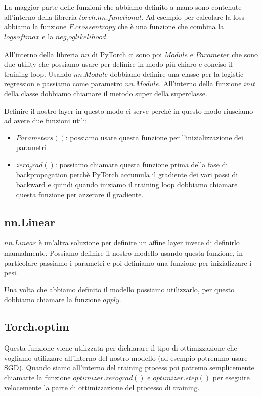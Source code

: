 \documentclass[14pt]{extreport}
\begin{document}
La maggior parte delle funzioni che abbiamo definito a mano sono contenute all'interno della libreria 
$torch.nn.functional$. Ad esempio per calcolare la loss abbiamo la funzione $F.crossentropy$ che è una funzione 
che combina la $logsoftmax$ e la $neg_loglikelihood$.

All'interno della libreria $nn$ di PyTorch ci sono poi $Module$ e $Parameter$ che sono due utility che possiamo 
usare per definire in modo più chiaro e conciso il training loop.
Usando $nn.Module$ dobbiamo definire una classe per la logistic regression e passiamo come parametro $nn.Module$.
All'interno della funzione $init$ della classe dobbiamo chiamare il metodo super della superclasse.

Definire il nostro layer in questo modo ci serve perchè in questo modo riusciamo ad avere due funzioni utili:

\begin{itemize}
	\item $Parameters()$: possiamo usare questa funzione per l'inizializzazione dei parametri
	\item $zero_grad()$: possiamo chiamare questa funzione prima della fase di backpropagation perchè 
	PyTorch accumula il gradiente dei vari passi di backward e quindi quando iniziamo il training loop 
	dobbiamo chiamare questa funzione per azzerare il gradiente.
\end{itemize}

\subsection{nn.Linear}

$nn.Linear$ è un'altra soluzione per definire un affine layer invece di definirlo manualmente.
Possiamo definire il nostro modello usando questa funzione, in particolare passiamo i parametri e poi definiamo 
una funzione per inizializzare i pesi.

Una volta che abbiamo definito il modello possiamo utilizzarlo, per questo dobbiamo chiamare
la funzione $apply$.

\subsection{Torch.optim}

Questa funzione viene utilizzata per dichiarare il tipo di ottimizzazione che vogliamo utilizzare all'interno
del nostro modello (ad esempio potremmo usare SGD).
Quando siamo all'interno del training process poi potremo semplicemente chiamarte la funzione $optimizer.zero grad()$ e $optimizer.step()$ per eseguire velocemente la parte di ottimizzazione del processo di training.
\end{document}
